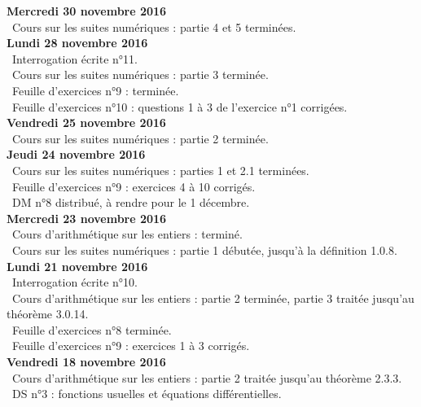 \documentclass[12pt,a4paper]{article}
\begin{document}
\noindent\textbf{Mercredi 30 novembre 2016}\\
\bu\ Cours sur les suites numériques : partie 4 et 5 terminées. \vspace{.4cm}\\

\noindent\textbf{Lundi 28 novembre 2016}\\
\bu\ Interrogation écrite n°11.\\
\bu\ Cours sur les suites numériques : partie 3 terminée.\\
\bu\ Feuille d'exercices n°9 : terminée.\\
\bu\ Feuille d'exercices n°10 : questions 1 à 3 de l'exercice n°1 corrigées. \vspace{.4cm}\\

\noindent\textbf{Vendredi 25 novembre 2016}\\
\bu\ Cours sur les suites numériques : partie 2 terminée.\vspace{.4cm}\\

\noindent\textbf{Jeudi 24 novembre 2016}\\
\bu\ Cours sur les suites numériques : parties 1 et 2.1 terminées.\\
\bu\ Feuille d'exercices n°9 : exercices 4 à 10 corrigés. \\
\bu\ DM n°8 distribué, à rendre pour le 1 décembre.\vspace{.4cm}\\

\noindent\textbf{Mercredi 23 novembre 2016}\\
\bu\ Cours d'arithmétique sur les entiers : terminé. \\
\bu\ Cours sur les suites numériques : partie 1 débutée, jusqu'à la définition 1.0.8.\vspace{.4cm}\\

\noindent\textbf{Lundi 21 novembre 2016}\\
\bu\ Interrogation écrite n°10.\\
\bu\ Cours d'arithmétique sur les entiers : partie 2 terminée, partie 3 traitée jusqu'au théorème 3.0.14. \\
\bu\ Feuille d'exercices n°8 terminée. \\
\bu\ Feuille d'exercices n°9 : exercices 1 à 3 corrigés.\vspace{.4cm}\\

\noindent\textbf{Vendredi 18 novembre 2016}\\
\bu\ Cours d'arithmétique sur les entiers : partie 2 traitée jusqu'au théorème 2.3.3. \\
\bu\ DS n°3 : fonctions  usuelles et équations différentielles.\vspace{.4cm}\\
\end{document}
